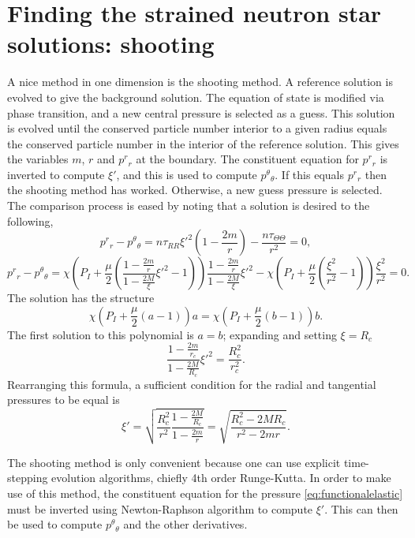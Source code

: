 \section{Finding the strained neutron star solutions: shooting}

A nice method in one dimension is the shooting method. A reference solution is evolved to give the background solution. The equation of state is modified via phase transition, and a new central pressure is selected as a guess. This solution is evolved until the conserved particle number interior to a given radius equals the conserved particle number in the interior of the reference solution. This gives the variables $m$, $r$ and $p^r{}_r$ at the boundary. The constituent equation for $p^r{}_r$ is inverted to compute $\xi'$, and this is used to compute $p^\theta{}_\theta$. If this equals $p^r{}_r$ then the shooting method has worked. Otherwise, a new guess pressure is selected. The comparison process is eased by noting that a solution is desired to the following,
\begin{equation}
p^r{}_r - p^\theta{}_\theta = n\tau_{RR}\xi'^2\left(1 - \frac{2m}{r}\right) - \frac{n\tau_{\Theta\Theta}}{r^2} = 0,
\end{equation}
\begin{equation}
p^r{}_r - p^\theta{}_\theta = \chi\left(P_I + \frac{\mu}{2}\left(\frac{1-\frac{2m}{r}}{1-\frac{2M}{\xi}}\xi'^2 - 1\right)\right)\frac{1-\frac{2m}{r}}{1-\frac{2M}{\xi}}\xi'^2 - \chi\left(P_I + \frac{\mu}{2} \left(\frac{\xi^2}{r^2} - 1\right) \right) \frac{\xi^2}{r^2} = 0.
\end{equation}
The solution has the structure
\begin{equation}
\chi\left(P_I + \frac{\mu}{2}(a - 1)\right)a = \chi\left(P_I + \frac{\mu}{2}(b - 1)\right)b.
\label{eq:rootStructure}
\end{equation}
The first solution to this polynomial is $a=b$; expanding and setting $\xi = R_c$
\begin{equation}
\frac{1-\frac{2m}{r_c}}{1-\frac{2M}{R_c}}\xi'^2 = \frac{R_c^2}{r_c^2}.
\label{eq:aEqualsb1}
\end{equation}
Rearranging this formula, a sufficient condition for the radial and tangential pressures to be equal is
\begin{equation}
\xi' = \sqrt{\frac{R_c^2}{r^2}\frac{1-\frac{2M}{R_c}}{1-\frac{2m}{r}}} = \sqrt{\frac{R_c^2-2M R_c}{r^2 - 2 m r}}.
\end{equation}


The shooting method is only convenient because one can use explicit time-stepping evolution algorithms, chiefly 4th order Runge-Kutta. In order to make use of this method, the constituent equation for the pressure \eqref{eq:functionalelastic} must be inverted using Newton-Raphson algorithm to compute $\xi'$. This can then be used to compute $p^\theta{}_\theta$ and the other derivatives.